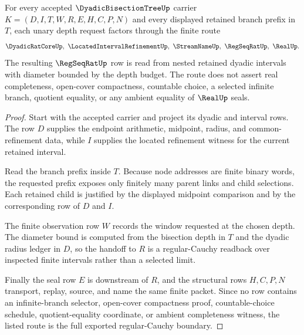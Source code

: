 \begin{theorem}
\label{thm:dyadic-bisection-tree-nested-regular-cauchy}
For every accepted $\DyadicBisectionTreeUp$ carrier $K=(D,I,T,W,R,E,H,C,P,N)$ and every displayed retained branch prefix in $T$, each unary depth request factors through the finite route
$$
\DyadicRatCoreUp,\ \LocatedIntervalRefinementUp,\ \StreamNameUp,\ \RegSeqRatUp,\ \RealUp .
$$
The resulting $\RegSeqRatUp$ row is read from nested retained dyadic intervals with diameter bounded by the depth budget. The route does not assert real completeness, open-cover compactness, countable choice, a selected infinite branch, quotient equality, or any ambient equality of $\RealUp$ seals.
\end{theorem}
\begin{proof}
Start with the accepted carrier and project its dyadic and interval rows. The row $D$ supplies the endpoint arithmetic, midpoint, radius, and common-refinement data, while $I$ supplies the located refinement witness for the current retained interval.

Read the branch prefix inside $T$. Because node addresses are finite binary words, the requested prefix exposes only finitely many parent links and child selections. Each retained child is justified by the displayed midpoint comparison and by the corresponding row of $D$ and $I$.

The finite observation row $W$ records the window requested at the chosen depth. The diameter bound is computed from the bisection depth in $T$ and the dyadic radius ledger in $D$, so the handoff to $R$ is a regular-Cauchy readback over inspected finite intervals rather than a selected limit.

Finally the seal row $E$ is downstream of $R$, and the structural rows $H,C,P,N$ transport, replay, source, and name the same finite packet. Since no row contains an infinite-branch selector, open-cover compactness proof, countable-choice schedule, quotient-equality coordinate, or ambient completeness witness, the listed route is the full exported regular-Cauchy boundary.
\end{proof}


